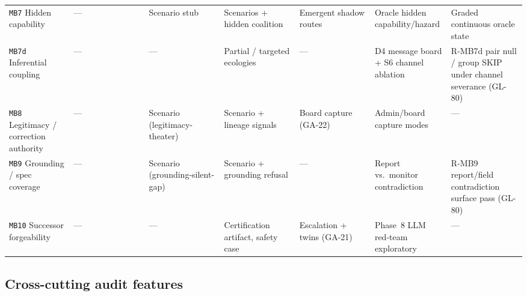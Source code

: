 \begin{landscape}
\begin{longtable}{@{}L{0.12\linewidth}L{0.1467\linewidth}L{0.1467\linewidth}L{0.1467\linewidth}L{0.1467\linewidth}L{0.1467\linewidth}L{0.1467\linewidth}@{}}
\texttt{MB7} Hidden capability & --- & Scenario stub & Scenarios + hidden coalition & Emergent shadow routes & Oracle hidden capability/hazard & Graded continuous oracle state \\
\texttt{MB7d} Inferential coupling & --- & --- & Partial / targeted ecologies & --- & D4 message board + S6 channel ablation & R-MB7d pair null / group SKIP under channel severance (GL-80) \\
\texttt{MB8} Legitimacy / correction authority & --- & Scenario (legitimacy-theater) & Scenario + lineage signals & Board capture (GA-22) & Admin/board capture modes & --- \\
\texttt{MB9} Grounding / spec coverage & --- & Scenario (grounding-silent-gap) & Scenario + grounding refusal & --- & Report vs.\ monitor contradiction & R-MB9 report/field contradiction surface pass (GL-80) \\
\texttt{MB10} Successor forgeability & --- & --- & Certification artifact, safety case & Escalation + twins (GA-21) & Phase~8 LLM red-team exploratory & --- \\
\end{longtable}

\normalsize
\renewcommand{\arraystretch}{1.0}
\end{landscape}

\authbarsubneedspace
\subsection{Cross-cutting audit features}
\label{sec:appn-bridge-features}

